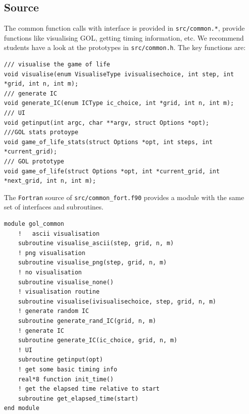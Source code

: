 \subsection{Source}
The common function calls with interface is provided in \texttt{src/common.*}, provide functions like visualising GOL, getting timing information, etc. We recommend students have a look at the prototypes in \texttt{src/common.h}. The key functions are:
\begin{center}
\begin{minipage}{0.95\textwidth}
\small
\begin{verbatim}
/// visualise the game of life
void visualise(enum VisualiseType ivisualisechoice, int step, int *grid, int n, int m);
/// generate IC
void generate_IC(enum ICType ic_choice, int *grid, int n, int m);
/// UI
void getinput(int argc, char **argv, struct Options *opt);
///GOL stats protoype
void game_of_life_stats(struct Options *opt, int steps, int *current_grid);
/// GOL prototype
void game_of_life(struct Options *opt, int *current_grid, int *next_grid, int n, int m);
\end{verbatim}
\end{minipage}
\end{center}
The \texttt{Fortran} source of \texttt{src/common\_fort.f90} provides a module with the same set of interfaces and subroutines. 
\begin{center}
\begin{minipage}{0.95\textwidth}
\small
\begin{verbatim}
module gol_common
    !   ascii visualisation
    subroutine visualise_ascii(step, grid, n, m)
    ! png visualisation
    subroutine visualise_png(step, grid, n, m)
    ! no visualisation
    subroutine visualise_none()
    ! visualisation routine
    subroutine visualise(ivisualisechoice, step, grid, n, m)
    ! generate random IC
    subroutine generate_rand_IC(grid, n, m)
    ! generate IC
    subroutine generate_IC(ic_choice, grid, n, m)
    ! UI
    subroutine getinput(opt)
    ! get some basic timing info
    real*8 function init_time()
    ! get the elapsed time relative to start
    subroutine get_elapsed_time(start)
end module
\end{verbatim}
\end{minipage}
\end{center}


